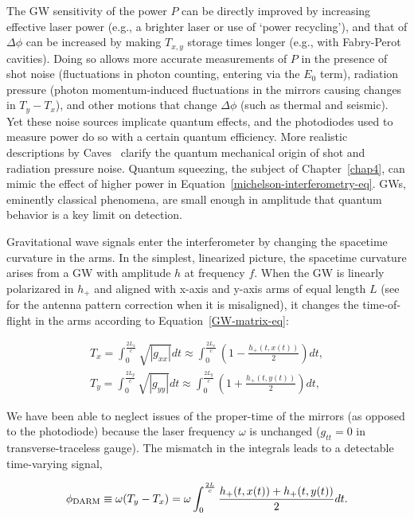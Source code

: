 The GW sensitivity of the power $P$ can be directly improved by increasing effective laser power (e.g., a brighter laser or use of `power recycling'), and that of $\Delta \phi$ can be increased by making $T_{x,y}$ storage times longer (e.g., with Fabry-Perot cavities).
Doing so allows more accurate measurements of $P$ in the presence of shot noise (fluctuations in photon counting, entering via the $E_0$ term), radiation pressure (photon momentum-induced fluctuations in the mirrors causing changes in $T_y - T_x$), and other motions that change $\Delta \phi$ (such as thermal and seismic).
Yet these noise sources implicate quantum effects, and the photodiodes used to measure power do so with a certain quantum efficiency.
More realistic descriptions by Caves~\cite{Caves1980,Caves1981} clarify the quantum mechanical origin of shot and radiation pressure noise.
Quantum squeezing, the subject of Chapter~\ref{chap4}, can mimic the effect of higher power in Equation~\ref{michelson-interferometry-eq}.
GWs, eminently classical phenomena, are small enough in amplitude that quantum behavior is a key limit on detection.

Gravitational wave signals enter the interferometer by changing the spacetime curvature in the arms. 
In the simplest, linearized picture, the spacetime curvature arises from a GW with amplitude $h$ at frequency $f$.
When the GW is linearly polarizared in $h_+$ and aligned with x-axis and y-axis arms of equal length $L$ (see~\cite{Jaranowski1998} for the antenna pattern correction when it is misaligned), it changes the time-of-flight in the arms according to Equation~\ref{GW-matrix-eq}:

\begin{eqnarray}
T_x = \int_0^{\frac{2L_x}{c}} \sqrt{|g_{xx}|} dt \approx \int_0^{\frac{2L_x}{c}} \left(1 - \frac{h_+ (t,x(t))}{2} \right) dt, \\
T_y = \int_0^{\frac{2L_y}{c}} \sqrt{|g_{yy}|} dt \approx \int_0^{\frac{2L_y}{c}} \left(1 + \frac{h_+ (t, y(t))}{2} \right) dt,
\end{eqnarray}

\noindent We have been able to neglect issues of the proper-time of the mirrors (as opposed to the photodiode) because the laser frequency $\omega$ is unchanged ($g_{tt} = 0$ in transverse-traceless gauge).
The mismatch in the integrals leads to a detectable time-varying signal,

\begin{equation}
\phi_{\textup{DARM}} \equiv \omega (T_y - T_x) = \omega \int_0^{\frac{2L}{c}} \frac{h_+ (t, x(t)) + h_+ (t, y(t))}{2} dt.
\end{equation}  

